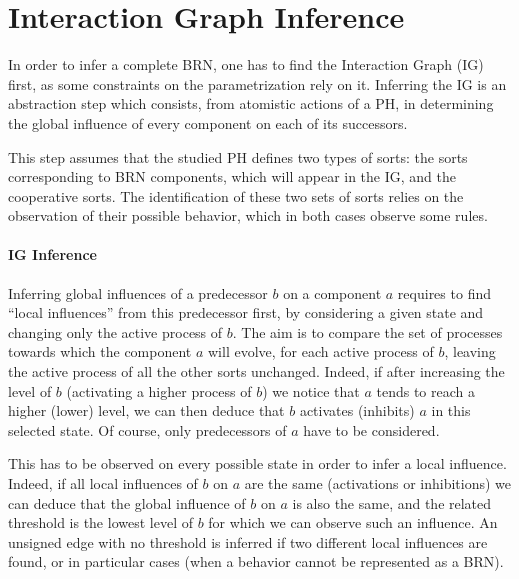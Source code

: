 \section{Interaction Graph Inference}\label{sec:infer-IG}

In order to infer a complete BRN, one has to find the Interaction Graph (IG) first, as some constraints on the parametrization rely on it.
Inferring the IG is an abstraction step which consists, from atomistic actions of a PH, in determining the global influence of every component on each of its successors.

This step assumes that the studied PH defines two types of sorts: the sorts corresponding to BRN components, which will appear in the IG, and the cooperative sorts.
The identification of these two sets of sorts relies on the observation of their possible behavior, which in both cases observe some rules.



\paragraph{IG Inference}\label{ssec:infer-IG}
%
Inferring global influences of a predecessor $b$ on a component $a$ requires to find “local influences” from this predecessor first, by considering a given state and changing only the active process of $b$.
The aim is to compare the set of processes towards which the component $a$ will evolve, for each active process of $b$, leaving the active process of all the other sorts unchanged.
Indeed, if after increasing the level of $b$ (\ie activating a higher process of $b$) we notice that $a$ tends to reach a higher (\resp lower) level, we can then deduce that $b$ activates (\resp inhibits) $a$ in this selected state.
Of course, only predecessors of $a$ have to be considered.

This has to be observed on every possible state in order to infer a local influence.
Indeed, if all local influences of $b$ on $a$ are the same (activations or inhibitions) we can deduce that the global influence of $b$ on $a$ is also the same, and the related threshold is the lowest level of $b$ for which we can observe such an influence.
An unsigned edge with no threshold is inferred if two different local influences are found, or in particular cases (when a behavior cannot be represented as a BRN).

